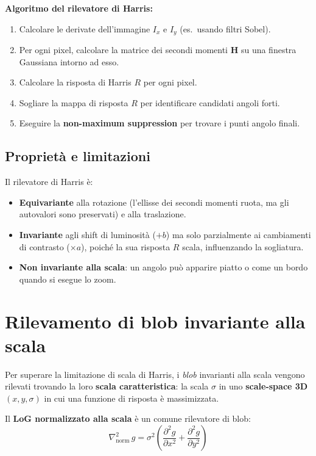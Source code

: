 \documentclass[12pt, a4paper]{report}
\begin{document}
\textbf{Algoritmo del rilevatore di Harris:}
\begin{enumerate}
  \item Calcolare le derivate dell'immagine $I_x$ e $I_y$ (es.\ usando filtri
        Sobel).
  \item Per ogni pixel, calcolare la matrice dei secondi momenti $\mathbf{H}$ su una
        finestra Gaussiana intorno ad esso.
  \item Calcolare la risposta di Harris $R$ per ogni pixel.
  \item Sogliare la mappa di risposta $R$ per identificare candidati angoli forti.
  \item Eseguire la \textbf{non-maximum suppression} per trovare i punti angolo
        finali.
\end{enumerate}

\subsection{Proprietà e limitazioni}

Il rilevatore di Harris è:
\begin{itemize}
  \item \textbf{Equivariante} alla rotazione (l'ellisse dei secondi momenti ruota,
        ma gli autovalori sono preservati) e alla traslazione.
  \item \textbf{Invariante} agli shift di luminosità ($+b$) ma solo parzialmente ai
        cambiamenti di contrasto ($\times a$), poiché la sua risposta $R$ scala,
        influenzando la sogliatura.
  \item \textbf{Non invariante alla scala}: un angolo può apparire piatto o come un
        bordo quando si esegue lo zoom.
\end{itemize}

\section{Rilevamento di blob invariante alla scala}

Per superare la limitazione di scala di Harris, i \textit{blob} invarianti alla
scala vengono rilevati trovando la loro \textbf{scala caratteristica}: la scala
$\sigma$ in uno \textbf{scale-space 3D} $(x, y, \sigma)$ in cui una funzione di
risposta è massimizzata.

Il \textbf{LoG normalizzato alla scala} è un comune rilevatore di blob:
\[
  \nabla^2_{\text{norm}}\,g
  = \sigma^2\left(\frac{\partial^2 g}{\partial x^2}
                 +\frac{\partial^2 g}{\partial y^2}\right)
\]
\end{document}
